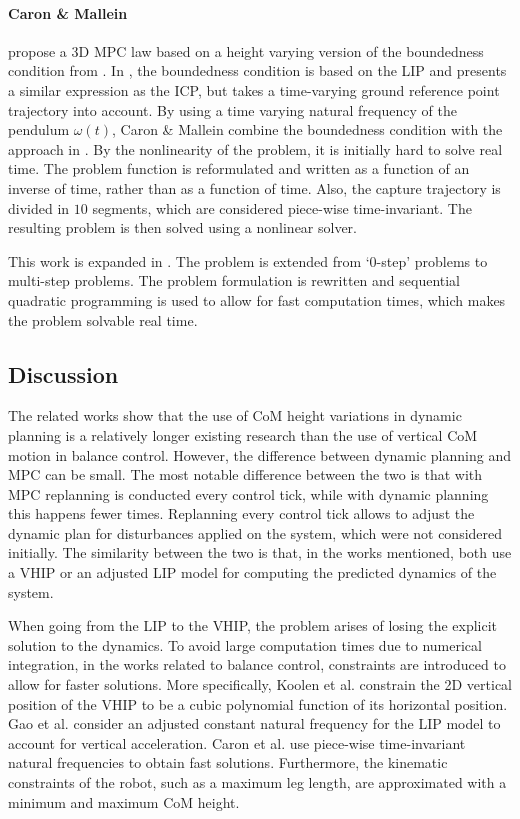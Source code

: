 \paragraph{Caron \& Mallein} propose a \ac{3D} \ac{MPC} law based on a height varying version of the boundedness condition from \cite{lanari2014boundedness}. In \cite{lanari2014boundedness}, the boundedness condition is based on the \ac{LIP} and presents a similar expression as the \ac{ICP}, but takes a time-varying ground reference point trajectory into account.  By using a time varying natural frequency of the pendulum $\omega(t)$, Caron \& Mallein combine the boundedness condition with the approach in \cite{hopkins2014humanoid}. By the nonlinearity of the problem, it is initially hard to solve real time. The problem function is reformulated and written as a function of an inverse of time, rather than as a function of time. Also, the capture trajectory is divided in $10$ segments, which are considered piece-wise time-invariant. The resulting problem is then solved using a nonlinear solver.

This work is expanded in \cite{caron2018capturability}. The problem is extended from `0-step' problems to multi-step problems. The problem formulation is rewritten and sequential quadratic programming is used to allow for fast computation times, which makes the problem solvable real time.

\subsection{Discussion}
The related works show that the use of \ac{CoM} height variations in dynamic planning is a relatively longer existing research than the use of  vertical \ac{CoM} motion in balance control. However, the difference between dynamic planning and \ac{MPC} can be small. The most notable difference between the two is that with \ac{MPC} replanning is conducted every control tick, while with dynamic planning this happens fewer times. Replanning every control tick allows to adjust the dynamic plan for disturbances applied on the system, which were not considered initially. The similarity between the two is that, in the works mentioned, both use a \ac{VHIP} or an adjusted \ac{LIP} model for computing the predicted dynamics of the system.

When going from the \ac{LIP} to the \ac{VHIP}, the problem arises of losing the explicit solution to the dynamics. To avoid large computation times due to numerical integration, in the works related to balance control, constraints are introduced to allow for faster solutions. More specifically, Koolen et al. constrain the \ac{2D} vertical position of the \ac{VHIP} to be a cubic polynomial function of its horizontal position. Gao et al. consider an adjusted constant natural frequency for the \ac{LIP} model to account for vertical acceleration. Caron et al. use piece-wise time-invariant natural frequencies to obtain fast solutions. Furthermore, the kinematic constraints of the robot, such as a maximum leg length, are approximated with a minimum and maximum \ac{CoM} height.

